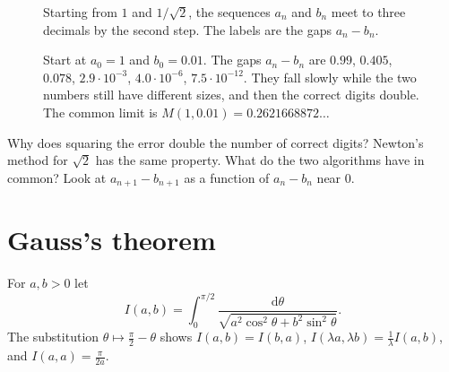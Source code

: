 \begin{figure}[ht]
\centering
{}
\caption{Starting from $1$ and $1/\sqrt2$, the sequences $a_n$ and $b_n$ meet to three decimals by the second step. The labels are the gaps $a_n-b_n$.}
\label{fig:rw13-iteration}
\end{figure}

\begin{figure}[ht]
\centering
{}
\caption{Start at $a_0=1$ and $b_0=0.01$. The gaps $a_n-b_n$ are $0.99$, $0.405$, $0.078$, $2.9\cdot10^{-3}$, $4.0\cdot10^{-6}$, $7.5\cdot10^{-12}$. They fall slowly
while the two numbers still have different sizes, and then the correct digits double. The common limit is $M(1,0.01)=0.2621668872\ldots$}
\label{fig:agm}
\end{figure}

\begin{think}
Why does squaring the error double the number of correct digits? Newton's method for $\sqrt2$ has the same property. What do the two algorithms have in common? Look at $a_{n+1}-b_{n+1}$ as a function of $a_n-b_n$ near $0$.
\end{think}

\section{Gauss's theorem}

For $a,b>0$ let
\[
I(a,b)=\int_0^{\pi/2}\frac{\mathrm d\theta}{\sqrt{a^2\cos^2\theta+b^2\sin^2\theta}}.
\]
The substitution $\theta\mapsto\frac\pi2-\theta$ shows $I(a,b)=I(b,a)$, $I(\lambda a,\lambda b)=\frac1\lambda I(a,b)$, and $I(a,a)=\frac\pi{2a}$.

